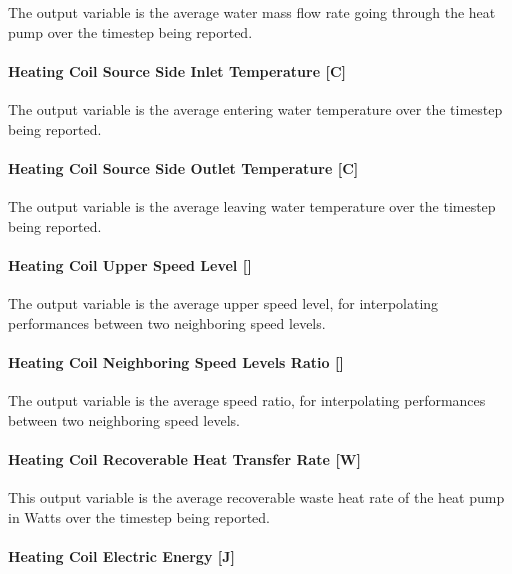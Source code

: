 The output variable is the average water mass flow rate going through the heat pump over the timestep being reported.

\paragraph{Heating Coil Source Side Inlet Temperature {[}C{]}}\label{heating-coil-source-side-inlet-temperature-c-1}

The output variable is the average entering water temperature over the timestep being reported.

\paragraph{Heating Coil Source Side Outlet Temperature {[}C{]}}\label{heating-coil-source-side-outlet-temperature-c-1}

The output variable is the average leaving water temperature over the timestep being reported.

\paragraph{Heating Coil Upper Speed Level {[]}}\label{heating-coil-upper-speed-level-1}

The output variable is the average upper speed level, for interpolating performances between two neighboring speed levels.

\paragraph{Heating Coil Neighboring Speed Levels Ratio {[]}}\label{heating-coil-neighboring-speed-levels-ratio-1}

The output variable is the average speed ratio, for interpolating performances between two neighboring speed levels.

\paragraph{Heating Coil Recoverable Heat Transfer Rate {[}W{]}}\label{heating-coil-recoverable-heat-transfer-rate-w}

This output variable is the average recoverable waste heat rate of the heat pump in Watts over the timestep being reported.

\paragraph{Heating Coil Electric Energy {[}J{]}}\label{heating-coil-electric-energy-j-6}

